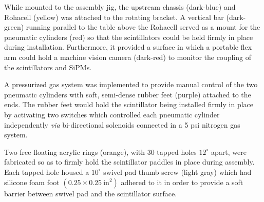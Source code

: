 While mounted to the assembly jig, the upstream chassis (dark-blue) and Rohacell (yellow) was attached to the rotating bracket.  A vertical bar (dark-green) running parallel to the table above the Rohacell served as a mount for the pneumatic cylinders (red) so that the scintillators could be held firmly in place during installation.  Furthermore, it provided a surface in which a portable flex arm could hold a machine vision camera (dark-red) to monitor the coupling of the scintillators and SiPMs.

A pressurized gas system was implemented to provide manual control of the two pneumatic cylinders with soft, semi-dense rubber feet (purple) attached to the ends.  The rubber feet would hold the scintillator being installed firmly in place by activating two switches which controlled each pneumatic cylinder independently \textit{via} bi-directional solenoids connected in a 5 psi nitrogen gas system.

Two free floating acrylic rings (orange), with 30 tapped holes $12^{\circ}$ apart, were fabricated so as to firmly hold the scintillator paddles in place during assembly. 
Each tapped hole housed a $10^{\circ}$ swivel pad thumb screw (light gray) which had silicone foam foot $(0.25 \times 0.25\ \mathrm{in^{2}})$ adhered to it in order to provide a soft barrier between swivel pad and the scintillator surface. 

